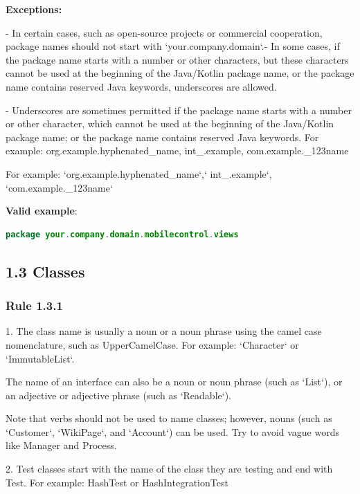 \textbf{Exceptions:} 



- In certain cases, such as open-source projects or commercial cooperation, package names should not start with `your.company.domain`.- In some cases, if the package name starts with a number or other characters, but these characters cannot be used at the beginning of the Java/Kotlin package name, or the package name contains reserved Java keywords, underscores are allowed.

- Underscores are sometimes permitted if the package name starts with a number or other character, which cannot be used at the beginning of the Java/Kotlin package name; or the package name contains reserved Java keywords. For example: org.example.hyphenated\_name, int\_.example, com.example.\_123name   

For example: `org.example.hyphenated\_name`,` int\_.example`, `com.example.\_123name`



\textbf{Valid example}: 

\begin{lstlisting}[language=Kotlin]
package your.company.domain.mobilecontrol.views
\end{lstlisting}


\subsection*{\textbf{1.3 Classes}}

\subsubsection*{\textbf{Rule 1.3.1}}
\leavevmode\newline



1.	The class name is usually a noun or a noun phrase using the camel case nomenclature, such as UpperCamelCase. For example: `Character` or `ImmutableList`.

The name of an interface can also be a noun or noun phrase (such as `List`), or an adjective or adjective phrase (such as `Readable`).

Note that verbs should not be used to name classes; however, nouns (such as `Customer`, `WikiPage`, and `Account`) can be used. Try to avoid vague words like Manager and Process.



2.	Test classes start with the name of the class they are testing and end with Test. For example: HashTest or HashIntegrationTest



